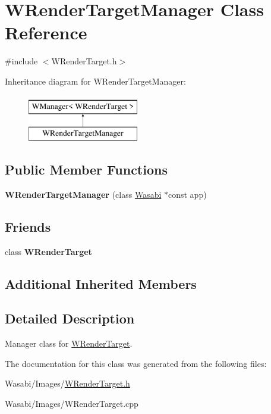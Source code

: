 \hypertarget{class_w_render_target_manager}{}\section{W\+Render\+Target\+Manager Class Reference}
\label{class_w_render_target_manager}


{\ttfamily \#include $<$W\+Render\+Target.\+h$>$}

Inheritance diagram for W\+Render\+Target\+Manager\+:\begin{figure}[H]
\begin{center}
\leavevmode
\includegraphics[height=2.000000cm]{class_w_render_target_manager}
\end{center}
\end{figure}
\subsection*{Public Member Functions}
\begin{DoxyCompactItemize}
\item 
{\bfseries W\+Render\+Target\+Manager} (class \hyperlink{class_wasabi}{Wasabi} $\ast$const app)\hypertarget{class_w_render_target_manager_a97f901a9e61c96f11c7f0926c50d35e7}{}\label{class_w_render_target_manager_a97f901a9e61c96f11c7f0926c50d35e7}

\end{DoxyCompactItemize}
\subsection*{Friends}
\begin{DoxyCompactItemize}
\item 
class {\bfseries W\+Render\+Target}\hypertarget{class_w_render_target_manager_a54738988203d150d3aaee8ff72ae2e76}{}\label{class_w_render_target_manager_a54738988203d150d3aaee8ff72ae2e76}

\end{DoxyCompactItemize}
\subsection*{Additional Inherited Members}


\subsection{Detailed Description}
Manager class for \hyperlink{class_w_render_target}{W\+Render\+Target}. 

The documentation for this class was generated from the following files\+:\begin{DoxyCompactItemize}
\item 
Wasabi/\+Images/\hyperlink{_w_render_target_8h}{W\+Render\+Target.\+h}\item 
Wasabi/\+Images/W\+Render\+Target.\+cpp\end{DoxyCompactItemize}
